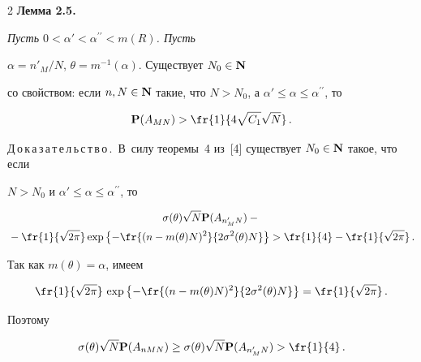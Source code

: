 \begin{multicols}{2}
\textbf{Лемма 2.5.} {\it Пусть $0< \alpha'< \alpha^{\prime\prime}<m(R)$. Пусть


$\alpha = n'_M/N$, $\theta=m^{-1}(\alpha)$. Существует $N_0\in{{\bf N}}$


со свойством: если $n, N\in {\N}$ такие, что $N>N_0$, а $


\alpha'\le\alpha\le \alpha^{\prime\prime}$, то


\begin{equation}


 \P(A_{MN}) > \fr{1}{4\sqrt{C_1}\sqrt{N}}\,.


\label{e2.8faz}


\end{equation}


}





\medskip





\noindent


Д\,о\,к\,а\,з\,а\,т\,е\,л\,ь\,с\,т\,в\,о\,.\ В~силу теоремы~4 из~[4] существует $N_0\in


{\N}$ такое, что если


 $N>N_0$ и $\alpha'\le\alpha\le \alpha^{\prime\prime}$, то


\begin{multline*}


 \sigma(\theta)\sqrt{N} \P(A_{n'_MN})-{}\\


{}-\fr{1}{\sqrt{2\pi}}\exp\left\{-\fr{(n-m(\theta)N)^2}{2\sigma^2(\theta)N}\right\}


>\fr{1}{4}-\fr{1}{ \sqrt{2\pi}}\,.


\end{multline*}


Так как $m(\theta)=\alpha$, имеем


$$


\fr{1}{\sqrt{2\pi}}\,\exp\left\{-\fr{(n-m(\theta)N)^2}{2\sigma^2(\theta)N}\right\}=\fr{1}{\sqrt{2\pi}}\,.


$$


Поэтому


\begin{equation}


\sigma(\theta)\sqrt{N} \P(A_{nMN})\ge \sigma(\theta)\sqrt{N}


\P(A_{n'_MN})


>\fr{1}{4}\,.


\label{e2.9faz}



\end{equation}
\end{multicols}
